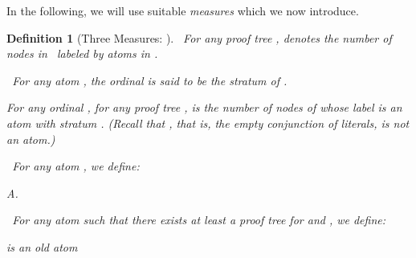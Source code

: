 \documentclass[english]{tlp}
\newtheorem{definition}{Definition} \newtheorem{example}{Example}       \newtheorem{remark}{Remark}
\begin{document}
\smallskip
In the following, we will use suitable \emph{measures} which we now introduce.

\begin{definition}[Three Measures:   ] 
\label{def:measure} ~For any proof tree , 
denotes the number of nodes in~ labeled by atoms in
.

~For any atom , the ordinal  is said 
to be the {\em{stratum}} of . 

\hangindent=7mm\hspace{3mm}For any ordinal , for any proof tree ,
 is the number of nodes 
of  whose label is an atom with stratum .
{\rm{(}}Recall that , that is,
the empty conjunction of literals, is {\it{not}} an atom.{\rm{)}}





~For any atom , we
define\/{\rm{:}}

\smallskip

\hspace*{8mm}

\makebox[69mm][l]{}A.

\smallskip

~For any atom  such that 
 there exists at least a proof tree for  and , we
define\/{\rm{:}}
\smallskip{}

\hspace*{8mm}\makebox[18mm][l]{}
\makebox[45mm][l]{}   is an old atom


\end{definition}
\end{document}
